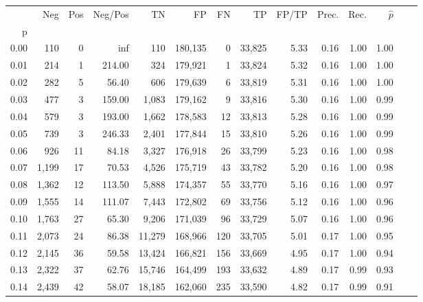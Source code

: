 \begin{tabular}{rrrrrrrrrrrrrr}
\toprule
{} &    Neg &  Pos & Neg/Pos &       TN &       FP &      FN &      TP & FP/TP & Prec. &  Rec. & $\hat{p}$ \\
p    &        &      &         &          &          &         &         &       &       &       &           \\
\midrule
0.00 &    110 &    0 &     inf &      110 &  180,135 &       0 &  33,825 &  5.33 &  0.16 &  1.00 &      1.00 \\
0.01 &    214 &    1 &  214.00 &      324 &  179,921 &       1 &  33,824 &  5.32 &  0.16 &  1.00 &      1.00 \\
0.02 &    282 &    5 &   56.40 &      606 &  179,639 &       6 &  33,819 &  5.31 &  0.16 &  1.00 &      1.00 \\
0.03 &    477 &    3 &  159.00 &    1,083 &  179,162 &       9 &  33,816 &  5.30 &  0.16 &  1.00 &      0.99 \\
0.04 &    579 &    3 &  193.00 &    1,662 &  178,583 &      12 &  33,813 &  5.28 &  0.16 &  1.00 &      0.99 \\
0.05 &    739 &    3 &  246.33 &    2,401 &  177,844 &      15 &  33,810 &  5.26 &  0.16 &  1.00 &      0.99 \\
0.06 &    926 &   11 &   84.18 &    3,327 &  176,918 &      26 &  33,799 &  5.23 &  0.16 &  1.00 &      0.98 \\
0.07 &  1,199 &   17 &   70.53 &    4,526 &  175,719 &      43 &  33,782 &  5.20 &  0.16 &  1.00 &      0.98 \\
0.08 &  1,362 &   12 &  113.50 &    5,888 &  174,357 &      55 &  33,770 &  5.16 &  0.16 &  1.00 &      0.97 \\
0.09 &  1,555 &   14 &  111.07 &    7,443 &  172,802 &      69 &  33,756 &  5.12 &  0.16 &  1.00 &      0.96 \\
0.10 &  1,763 &   27 &   65.30 &    9,206 &  171,039 &      96 &  33,729 &  5.07 &  0.16 &  1.00 &      0.96 \\
0.11 &  2,073 &   24 &   86.38 &   11,279 &  168,966 &     120 &  33,705 &  5.01 &  0.17 &  1.00 &      0.95 \\
0.12 &  2,145 &   36 &   59.58 &   13,424 &  166,821 &     156 &  33,669 &  4.95 &  0.17 &  1.00 &      0.94 \\
0.13 &  2,322 &   37 &   62.76 &   15,746 &  164,499 &     193 &  33,632 &  4.89 &  0.17 &  0.99 &      0.93 \\
0.14 &  2,439 &   42 &   58.07 &   18,185 &  162,060 &     235 &  33,590 &  4.82 &  0.17 &  0.99 &      0.91 \\

\end{tabular}
